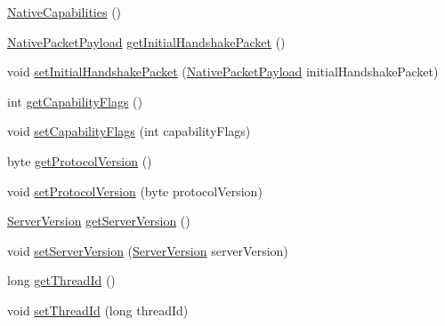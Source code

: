 \begin{DoxyCompactItemize}
\item 
\mbox{\hyperlink{classcom_1_1mysql_1_1cj_1_1protocol_1_1a_1_1_native_capabilities_a598a62923a59e3a9422601250a0fc470}{Native\+Capabilities}} ()
\item 
\mbox{\hyperlink{classcom_1_1mysql_1_1cj_1_1protocol_1_1a_1_1_native_packet_payload}{Native\+Packet\+Payload}} \mbox{\hyperlink{classcom_1_1mysql_1_1cj_1_1protocol_1_1a_1_1_native_capabilities_ae3031dc2ed965418fecbfb258e727df4}{get\+Initial\+Handshake\+Packet}} ()
\item 
void \mbox{\hyperlink{classcom_1_1mysql_1_1cj_1_1protocol_1_1a_1_1_native_capabilities_a2f9c9f869eccf80189644751c27e1733}{set\+Initial\+Handshake\+Packet}} (\mbox{\hyperlink{classcom_1_1mysql_1_1cj_1_1protocol_1_1a_1_1_native_packet_payload}{Native\+Packet\+Payload}} initial\+Handshake\+Packet)
\item 
int \mbox{\hyperlink{classcom_1_1mysql_1_1cj_1_1protocol_1_1a_1_1_native_capabilities_a7448ca6f45b07ebfd3126b4fcc5ea391}{get\+Capability\+Flags}} ()
\item 
void \mbox{\hyperlink{classcom_1_1mysql_1_1cj_1_1protocol_1_1a_1_1_native_capabilities_a15278c5085a8bc602e70df6edda8ac80}{set\+Capability\+Flags}} (int capability\+Flags)
\item 
byte \mbox{\hyperlink{classcom_1_1mysql_1_1cj_1_1protocol_1_1a_1_1_native_capabilities_a6bca3ca573c4fefb9478470f24a840d8}{get\+Protocol\+Version}} ()
\item 
void \mbox{\hyperlink{classcom_1_1mysql_1_1cj_1_1protocol_1_1a_1_1_native_capabilities_ac4815574def433e114f9343832694f69}{set\+Protocol\+Version}} (byte protocol\+Version)
\item 
\mbox{\hyperlink{classcom_1_1mysql_1_1cj_1_1_server_version}{Server\+Version}} \mbox{\hyperlink{classcom_1_1mysql_1_1cj_1_1protocol_1_1a_1_1_native_capabilities_a8c04f8697fc28a955b4d1aedf4b14ec8}{get\+Server\+Version}} ()
\item 
void \mbox{\hyperlink{classcom_1_1mysql_1_1cj_1_1protocol_1_1a_1_1_native_capabilities_a9785f3b62dcfb7fef17a97d74510c5fa}{set\+Server\+Version}} (\mbox{\hyperlink{classcom_1_1mysql_1_1cj_1_1_server_version}{Server\+Version}} server\+Version)
\item 
long \mbox{\hyperlink{classcom_1_1mysql_1_1cj_1_1protocol_1_1a_1_1_native_capabilities_af174684480c5766977ba9c840648b732}{get\+Thread\+Id}} ()
\item 
void \mbox{\hyperlink{classcom_1_1mysql_1_1cj_1_1protocol_1_1a_1_1_native_capabilities_a34aa8f4f2048601844708e7130d5d7c3}{set\+Thread\+Id}} (long thread\+Id)

\end{DoxyCompactItemize}
